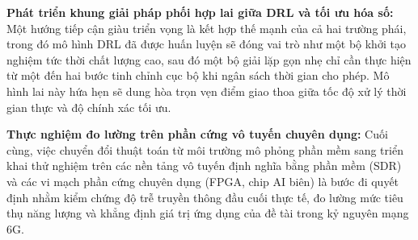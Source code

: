 \textbf{Phát triển khung giải pháp phối hợp lai giữa DRL và tối ưu hóa số:} Một hướng tiếp cận giàu triển vọng là kết
hợp thế mạnh của cả hai trường phái, trong đó mô hình DRL đã được huấn luyện sẽ đóng vai trò như một bộ khởi tạo
nghiệm tức thời chất lượng cao, sau đó một bộ giải lặp gọn nhẹ chỉ cần thực hiện từ một đến hai bước tinh chỉnh cục
bộ khi ngân sách thời gian cho phép. Mô hình lai này hứa hẹn sẽ dung hòa trọn vẹn điểm giao thoa giữa tốc độ xử lý
thời gian thực và độ chính xác tối ưu.

\textbf{Thực nghiệm đo lường trên phần cứng vô tuyến chuyên dụng:} Cuối cùng, việc chuyển đổi thuật toán từ môi trường
mô phỏng phần mềm sang triển khai thử nghiệm trên các nền tảng vô tuyến định nghĩa bằng phần mềm (SDR) và các vi mạch
phần cứng chuyên dụng (FPGA, chip AI biên) là bước đi quyết định nhằm kiểm chứng độ trễ truyền thông đầu cuối thực
tế, đo lường mức tiêu thụ năng lượng và khẳng định giá trị ứng dụng của đề tài trong kỷ nguyên mạng 6G.
